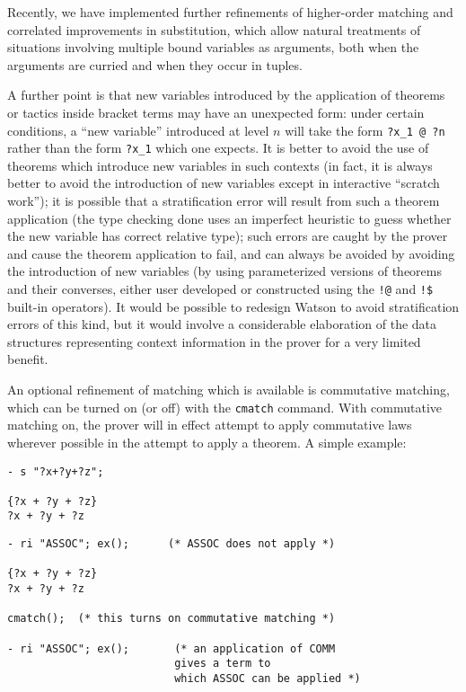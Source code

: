 \documentclass{kluwer}
\begin{document}
\begin{article}
Recently, we have implemented further refinements of higher-order
matching and correlated improvements in substitution, which allow
natural treatments of situations involving multiple bound variables as
arguments, both when the arguments are curried and when they occur in
tuples.

A further point is that new variables introduced by the application of
theorems or tactics inside bracket terms may have an unexpected form:
under certain conditions, a ``new variable'' introduced at level $n$
will take the form {\tt ?x\_1 @ ?n} rather than the form {\tt ?x\_1}
which one expects.  It is better to avoid the use of theorems which
introduce new variables in such contexts (in fact, it is always better
to avoid the introduction of new variables except in interactive
``scratch work''); it is possible that a stratification error will
result from such a theorem application (the type checking done uses an
imperfect heuristic to guess whether the new variable has correct
relative type); such errors are caught by the prover and cause the
theorem application to fail, and can always be avoided by avoiding the
introduction of new variables (by using parameterized versions of
theorems and their converses, either user developed or constructed
using the {\tt !@} and {\tt !\$} built-in operators).  It would be
possible to redesign Watson to avoid stratification errors of this
kind, but it would involve a considerable elaboration of the data
structures representing context information in the prover for a very
limited benefit.

An optional refinement of matching which is available is commutative
matching, which can be turned on (or off) with the {\tt cmatch}
command.  With commutative matching on, the prover will in effect
attempt to apply commutative laws wherever possible in the attempt to
apply a theorem.  A simple example:

\begin{verbatim}
- s "?x+?y+?z";

{?x + ?y + ?z}
?x + ?y + ?z
\end{verbatim}
\newpage
\begin{verbatim}
- ri "ASSOC"; ex();      (* ASSOC does not apply *)

{?x + ?y + ?z}
?x + ?y + ?z

cmatch();  (* this turns on commutative matching *)

- ri "ASSOC"; ex();       (* an application of COMM 
                          gives a term to
                          which ASSOC can be applied *)


\end{verbatim}
\end{article}
\end{document}
